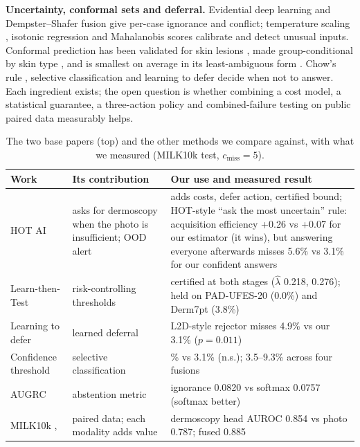 \documentclass[conference]{IEEEtran}
\begin{document}
\textbf{Uncertainty, conformal sets and deferral.} Evidential deep learning
\cite{sensoy2018edl} and Dempster--Shafer fusion \cite{shafer1976,han2021tmc} give per-case
ignorance and conflict; temperature scaling \cite{guo2017calibration}, isotonic regression
\cite{zadrozny2002isotonic} and Mahalanobis scores \cite{lee2018mahalanobis} calibrate and
detect unusual inputs. Conformal prediction has been validated for skin lesions
\cite{fayyad2024cp}, made group-conditional by skin type \cite{lu2022fair}, and is smallest
on average in its least-ambiguous form \cite{sadinle2019lac}. Chow's rule \cite{chow1970},
selective classification \cite{geifman2017selective} and learning to defer
\cite{mozannar2020defer} decide when not to answer. Each ingredient exists; the open question
is whether combining a cost model, a statistical guarantee, a three-action policy and
combined-failure testing on public paired data measurably helps.

\begin{table}[t]
\centering
\caption{The two base papers (top) and the other methods we compare against, with what we
measured (MILK10k test, $c_{\mathrm{miss}}=5$).}
\label{tab:base}
\setlength{\tabcolsep}{2pt}
\scriptsize
\begin{tabular}{>{\raggedright\arraybackslash}p{1.45cm}>{\raggedright\arraybackslash}p{2.45cm}>{\raggedright\arraybackslash}p{3.7cm}}
\toprule
Work & Its contribution & Our use and measured result \\
\midrule
HOT AI \cite{mehta2025hotai} & asks for dermoscopy when the photo is insufficient; OOD alert & adds costs, defer action, certified bound; HOT-style ``ask the most uncertain'' rule: acquisition efficiency +0.26 vs +0.07 for our estimator (it wins), but answering everyone afterwards misses 5.6\% vs 3.1\% for our confident answers \\
Learn-then-Test \cite{angelopoulos2025ltt} & risk-controlling thresholds & certified at both stages ($\hat\lambda$ 0.218, 0.276); held on PAD-UFES-20 (0.0\%) and Derm7pt (3.8\%) \\
\midrule
Learning to defer \cite{mozannar2020defer} & learned deferral & L2D-style rejector misses 4.9\% vs our 3.1\% ($p=0.011$) \\
Confidence threshold \cite{geifman2017selective} & selective classification & 3.8\% vs 3.1\% (n.s.); 3.5--9.3\% across four fusions \\
AUGRC \cite{traub2024augrc} & abstention metric & ignorance 0.0820 vs softmax 0.0757 (softmax better) \\
MILK10k \cite{milk10k}, \cite{muller2026jaad} & paired data; each modality adds value & dermoscopy head AUROC 0.854 vs photo 0.787; fused 0.885 \\
\bottomrule
\end{tabular}
\end{table}
\end{document}
